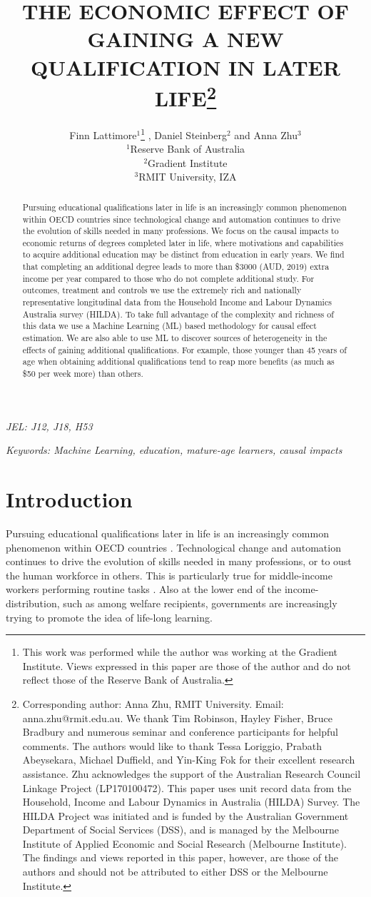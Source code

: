 \documentclass[12pt, a4paper]{article}
\title{THE ECONOMIC EFFECT OF GAINING A NEW QUALIFICATION IN LATER LIFE\thanks{\scriptsize{Corresponding author: Anna Zhu, RMIT University. Email: anna.zhu@rmit.edu.au. \newline \newline We thank Tim Robinson, Hayley Fisher, Bruce Bradbury and numerous seminar and conference participants for helpful comments. The authors would like to thank Tessa Loriggio, Prabath Abeysekara, Michael Duffield, and Yin-King Fok for their excellent research assistance. \newline \newline Zhu acknowledges the support of the Australian Research Council Linkage Project (LP170100472). This paper uses unit record data from the Household, Income and Labour Dynamics in Australia (HILDA) Survey. The HILDA Project was initiated and is funded by the Australian Government Department of Social Services (DSS), and is managed by the Melbourne Institute of Applied Economic and Social Research (Melbourne Institute). The findings and views reported in this paper, however, are those of the authors and should not be attributed to either DSS or the Melbourne Institute.}}} \vspace{0.2cm} \author{Finn Lattimore$^1$\thanks{\scriptsize{This work was performed while the author was working at the Gradient Institute. Views expressed in this paper are those of the author and do not reflect those of the Reserve Bank of Australia.}}\vspace{0.2cm} ,  Daniel Steinberg$^2$ and Anna Zhu$^3$ \\\small {$^1$Reserve Bank of Australia} \vspace{0.2cm} \\ {$^2$Gradient Institute} \vspace{0.2cm} \\ {$^3$RMIT University, IZA}}
\begin{document}

\maketitle


\begin{abstract}
  
Pursuing educational qualifications later in life is an increasingly common
phenomenon within OECD countries since technological change and automation
continues to drive the evolution of skills needed in many professions. We focus
on the causal impacts to economic returns of degrees completed later in life,
where motivations and capabilities to acquire additional education may be
distinct from education in early years. We find that completing an additional
degree leads to more than \$3000 (AUD, 2019) extra income per year compared to
those who do not complete additional study. For outcomes, treatment and
controls we use the extremely rich and nationally representative longitudinal
data from the Household Income and Labour Dynamics Australia survey (HILDA). To
take full advantage of the complexity and richness of this data we use a
Machine Learning (ML) based methodology for causal effect estimation. We are
also able to use ML to discover sources of heterogeneity in the effects of
gaining additional qualifications. For example, those younger than 45 years of
age when obtaining additional qualifications tend to reap more benefits (as
much as \$50 per week more) than others.

\end{abstract}


\emph{JEL: J12, J18, H53}

\emph{Keywords: Machine Learning, education, mature-age learners, causal impacts}


\clearpage
\onehalfspacing


\section{Introduction}

Pursuing educational qualifications later in life is an increasingly common
phenomenon within OECD countries \citep{oecd2016}. Technological change and
automation continues to drive the evolution of skills needed in many
professions, or to oust the human workforce in others. This is particularly
true for middle-income workers performing routine tasks
\citep{autor2008,acemoglu2011}. Also at the lower end of the
income-distribution, such as among welfare recipients, governments are
increasingly trying to promote the idea of life-long learning.
\end{document}
